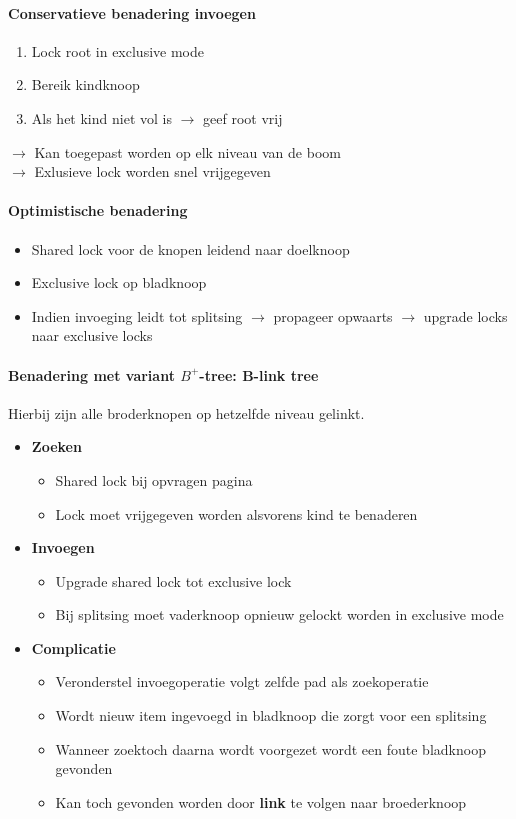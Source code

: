 \paragraph{Conservatieve benadering invoegen}
\begin{enumerate}
	\item Lock root in exclusive mode
	\item Bereik kindknoop
	\item Als het kind niet vol is $\rightarrow$ geef root vrij
\end{enumerate}
$\rightarrow$ Kan toegepast worden op elk niveau van de boom \\
$\rightarrow$ Exlusieve lock worden snel vrijgegeven

\paragraph{Optimistische benadering}
\begin{itemize}
	\item Shared lock voor de knopen leidend naar doelknoop
	\item Exclusive lock op bladknoop
	\item Indien invoeging leidt tot splitsing $\rightarrow$ propageer opwaarts $\rightarrow$ upgrade locks naar exclusive locks
\end{itemize}

\paragraph{Benadering met variant $B^+$-tree: B-link tree}
Hierbij zijn alle broderknopen op hetzelfde niveau gelinkt.
\begin{itemize}
	\item \textbf{Zoeken}
		\begin{itemize}
			\item Shared lock bij opvragen pagina
			\item Lock moet vrijgegeven worden alsvorens kind te benaderen		
		\end{itemize}
	\item \textbf{Invoegen}
	\begin{itemize}
		\item Upgrade shared lock tot exclusive lock
		\item Bij splitsing moet vaderknoop opnieuw gelockt worden in exclusive mode
	\end{itemize}
	\item \textbf{Complicatie}
		\begin{itemize}
			\item Veronderstel invoegoperatie volgt zelfde pad als zoekoperatie
			\item Wordt nieuw item ingevoegd in bladknoop die zorgt voor een splitsing
			\item Wanneer zoektoch daarna wordt voorgezet wordt een foute bladknoop gevonden
			\item Kan toch gevonden worden door \textbf{link} te volgen naar broederknoop
		\end{itemize}
\end{itemize}



